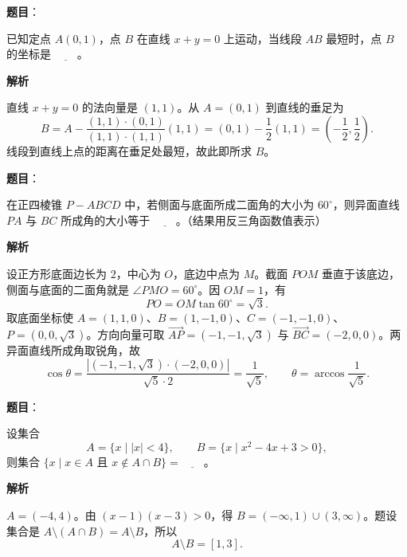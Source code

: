 \begin{answer}

\textbf{题目}：

已知定点 \(A(0,1)\)，点 \(B\) 在直线 \(x+y=0\) 上运动，当线段 \(AB\) 最短时，点 \(B\) 的坐标是 \(\underline{\qquad}\)。

\textbf{解析}

直线 \(x+y=0\) 的法向量是 \((1,1)\)。从 \(A=(0,1)\) 到直线的垂足为
\nopagebreak[4]
\[
B=A-\frac{(1,1)\cdot(0,1)}{(1,1)\cdot(1,1)}(1,1)
=(0,1)-\frac12(1,1)=\left(-\frac12,\frac12\right).
\]
线段到直线上点的距离在垂足处最短，故此即所求 \(B\)。


\end{answer}
\begin{answer}

\textbf{题目}：

在正四棱锥 \(P-ABCD\) 中，若侧面与底面所成二面角的大小为 \(60^\circ\)，则异面直线 \(PA\) 与 \(BC\) 所成角的大小等于 \(\underline{\qquad}\)。（结果用反三角函数值表示）

\textbf{解析}

设正方形底面边长为 \(2\)，中心为 \(O\)，底边中点为 \(M\)。截面 \(POM\) 垂直于该底边，侧面与底面的二面角就是 \(\angle PMO=60^\circ\)。因 \(OM=1\)，有
\nopagebreak[4]
\[
PO=OM\tan60^\circ=\sqrt3.
\]
取底面坐标使 \(A=(1,1,0)\)、\(B=(1,-1,0)\)、\(C=(-1,-1,0)\)、\(P=(0,0,\sqrt3)\)。方向向量可取 \(\overrightarrow{AP}=(-1,-1,\sqrt3)\) 与 \(\overrightarrow{BC}=(-2,0,0)\)。两异面直线所成角取锐角，故
\nopagebreak[4]
\[
\cos\theta=\frac{|(-1,-1,\sqrt3)\cdot(-2,0,0)|}{\sqrt5\cdot2}=\frac1{\sqrt5},\qquad
\theta=\arccos\frac1{\sqrt5}.
\]


\end{answer}
\begin{answer}

\textbf{题目}：

设集合
\nopagebreak[4]
\[
   A=\{x\mid |x|<4\},\qquad B=\{x\mid x^2-4x+3>0\},
\]
   则集合 \(\{x\mid x\in A\text{ 且 }x\notin A\cap B\}=\underline{\qquad}\)。

\textbf{解析}

\(A=(-4,4)\)。由 \((x-1)(x-3)>0\)，得 \(B=(-\infty,1)\cup(3,\infty)\)。题设集合是 \(A\setminus(A\cap B)=A\setminus B\)，所以
\nopagebreak[4]
\[
A\setminus B=[1,3].
\]


\end{answer}
